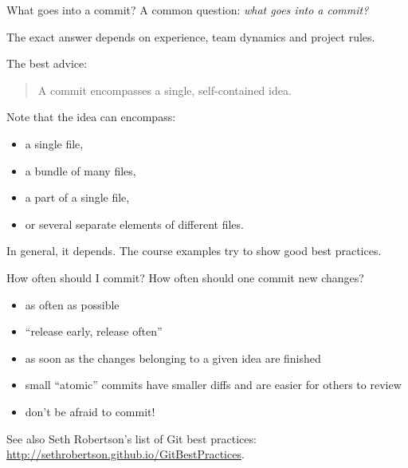 \documentclass{git_course}
\begin{document}
\begin{frame}[fragile]{What goes into a commit?}
    A common question: \emph{what goes into a commit?}

    The exact answer depends on experience, team dynamics and project rules.

    The best advice:

    \begin{quote}
        A commit encompasses a single, self-contained idea.
    \end{quote}

    Note that the idea can encompass:
    \begin{itemize}
        \item a single file,
        \item a bundle of many files,
        \item a part of a single file,
        \item or several separate elements of different files.
    \end{itemize}

    In general, it depends.  The course examples try to show good best
    practices.
\end{frame}

\begin{frame}[fragile]{How often should I commit?}
    How often should one commit new changes?
    \begin{itemize}
        \item as often as possible
        \item ``release early, release often''
        \item as soon as the changes belonging to a given idea are
            finished
        \item small ``atomic'' commits have smaller diffs and are easier for
            others to review
        \item don't be afraid to commit!
    \end{itemize}

    See also Seth Robertson's list of Git best practices:
    {\footnotesize \url{http://sethrobertson.github.io/GitBestPractices}}.
\end{frame}
\end{document}
